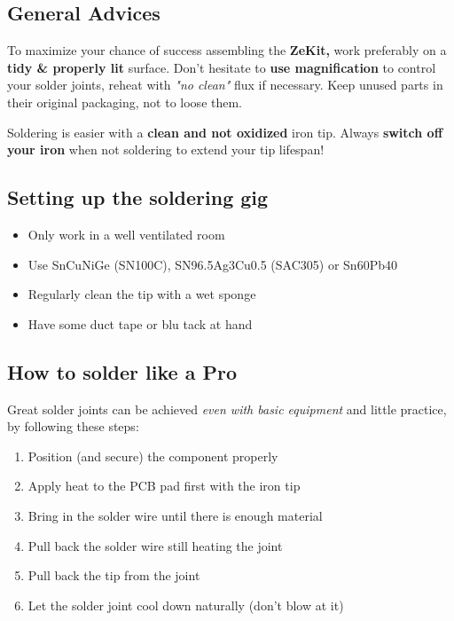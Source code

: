 \documentclass{scrartcl}
\begin{document}
\subsection{General Advices}

To maximize your chance of success assembling the \textbf{ZeKit,} work preferably on a \textbf{tidy \& properly lit} surface.
Don't hesitate to \textbf{use magnification} to control your solder joints, reheat with \emph{"no clean"} flux if necessary.
Keep unused parts in their original packaging, not to loose them.

Soldering is easier with a \textbf{clean and not oxidized} iron tip. Always \textbf{switch off your iron} when not soldering to extend your tip lifespan!

\subsection{Setting up the soldering gig}

\begin{itemize}
    \item Only work in a well ventilated room
    \item Use SnCuNiGe (SN100C), SN96.5Ag3Cu0.5 (SAC305) or Sn60Pb40
    \item Regularly clean the tip with a wet sponge
    \item Have some duct tape or blu tack at hand
\end{itemize}

\subsection{How to solder like a Pro}

Great solder joints can be achieved \emph{even with basic equipment} and little practice,\\
by following these steps:

\begin{enumerate}
    \item Position (and secure) the component properly
    \item Apply heat to the PCB pad first with the iron tip
    \item Bring in the solder wire until there is enough material
    \item Pull back the solder wire still heating the joint
    \item Pull back the tip from the joint
    \item Let the solder joint cool down naturally (don't blow at it)
\end{enumerate}
\end{document}
